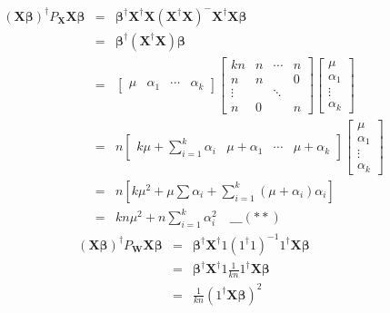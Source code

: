 \documentclass{article}
\begin{document}
\begin{eqnarray*}
\left( \mathbf{X\beta }\right) ^{\dagger }P_{\mathbf{X}}\mathbf{X\beta } &=&%
\mathbf{\mathbf{\beta }^{\dagger }\mathbf{X^{\dagger }}X}\left( \mathbf{X}%
^{\dagger }\mathbf{X}\right) ^{-}\mathbf{X}^{\dagger }\mathbf{X\beta } \\
&=&\mathbf{\mathbf{\beta }^{\dagger }}\left( \mathbf{\mathbf{X^{\dagger }}X}%
\right) \mathbf{\beta } \\
&=&\left[ 
\begin{array}{cccc}
\mu  & \alpha _{1} & \cdots  & \alpha _{k}%
\end{array}%
\right] \left[ 
\begin{array}{cccc}
kn & n & \cdots  & n \\ 
n & n &  & 0 \\ 
\vdots  &  & \ddots  &  \\ 
n & 0 &  & n%
\end{array}%
\right] \left[ 
\begin{array}{c}
\mu  \\ 
\alpha _{1} \\ 
\vdots  \\ 
\alpha _{k}%
\end{array}%
\right]  \\
&=&n\left[ 
\begin{array}{cccc}
k\mu +\sum\limits_{i=1}^{k}\alpha _{i} & \mu +\alpha _{1} & \cdots  & \mu
+\alpha _{k}%
\end{array}%
\right] \left[ 
\begin{array}{c}
\mu  \\ 
\alpha _{1} \\ 
\vdots  \\ 
\alpha _{k}%
\end{array}%
\right]  \\
&=&n\left[ k\mu ^{2}+\mu \sum \alpha _{i}+\sum\limits_{i=1}^{k}\left( \mu
+\alpha _{i}\right) \alpha _{i}\right]  \\
&=&kn\mu ^{2}+n\sum_{i=1}^{k}\alpha _{i}^{2}\mathbf{\quad \_\_\_}\left( \ast
\ast \right) 
\end{eqnarray*}%
\begin{eqnarray*}
\left( \mathbf{X\beta }\right) ^{\dagger }P_{\mathbf{W}}\mathbf{X\beta } &=&%
\mathbf{\mathbf{\beta }^{\dagger }\mathbf{X^{\dagger }}}1\left( 1^{\dagger
}1\right) ^{-1}1^{\dagger }\mathbf{X\beta } \\
&=&\mathbf{\mathbf{\beta }^{\dagger }\mathbf{X^{\dagger }}}1\frac{1}{kn}%
1^{\dagger }\mathbf{X\beta } \\
&=&\frac{1}{kn}\left( 1^{\dagger }\mathbf{X\beta }\right) ^{2}
\end{eqnarray*}
\end{document}
